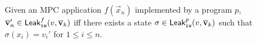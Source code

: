 \begin{proposition}
Given an MPC application $f(\vec{x}_n)$  implemented by a program $p$,
$\overline{\bf{v}}_n'\in{\sf Leak}_{\tt iw}^f(v,\overline{\bf{v}}_k)$
iff there exists a state $\sigma\in {\sf Leak}_{\tt iw}^p(v,\overline{\bf{v}}_k)$
such that $\sigma(x_i)=v_i'$ for $1\leq i\leq n$.
%
\end{proposition}



%

